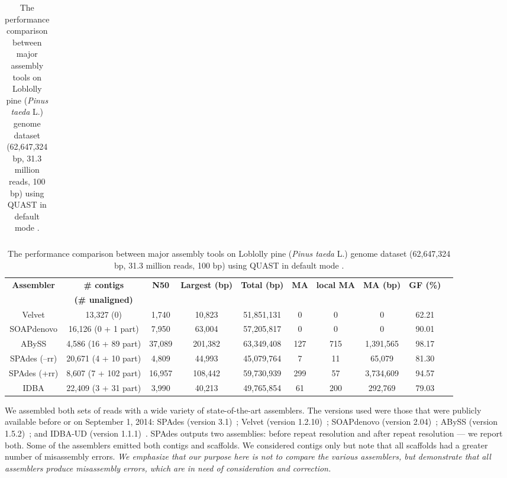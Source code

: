 \begin{table}[h!]
\begin{center}
\begin{tabular}{|c|c|c|c|c|c|c|c|c|c}
\end{tabular}
\label{tab:ging}
\vspace{10mm}
\caption{\footnotesize{The performance comparison between major assembly tools on Loblolly pine ({\em Pinus taeda} L.) genome dataset (62,647,324 bp, 31.3 million reads, 100 bp) using QUAST in default mode \cite{quast}.}}
\label{tab:pine}
\begin{tabular}{|c|c|c|c|c|c|c|c|c|c}
\hline
\textbf{Assembler} 			&{\bf \# contigs }		& \textbf{N50}	& \textbf{Largest (bp)}	& \textbf{Total (bp) }	&\textbf{MA}	&\textbf{local MA}	& {\bf MA (bp)} 		& \textbf{GF (\%)} \\ 
 						&{\bf (\# unaligned) }		& 			& 					& 				&			& 			& 				& \\ \hline
Velvet					& 13,327 (0)			& 1,740		& 10,823				& 51,851,131 		& 0			& 0			& 0				& 62.21			  \\ \hline
SOAPdenovo 				& 16,126 (0 + 1 part)		& 7,950		& 63,004				& 57,205,817 		& 0			& 0			& 0				& 90.01				\\ \hline
ABySS					& 4,586 (16 + 89 part)  	& 37,089  		& 201,382				& 63,349,408		& 127  		& 715		& 1,391,565		& 98.17  			 	 \\ \hline
SPAdes (--rr)				& 20,671 (4 + 10 part) 	& 4,809		& 44,993				& 45,079,764		& 7 			& 11			& 65,079			& 81.30			 	 \\ \hline
SPAdes (+rr)				& 8,607 (7 + 102 part) 	& 16,957		& 108,442				& 59,730,939 		& 299 		& 57			& 3,734,609		& 94.57			 	 \\ \hline
IDBA						& 22,409 (3 + 31 part)	& 3,990 		& 40,213				& 49,765,854		& 61			& 200		& 292,769			& 79.03  				 \\ \hline
\end{tabular}
\end{center}
\end{table}


We assembled both sets of reads with a wide variety of state-of-the-art assemblers.  The versions used were those that were publicly available before or on September 1, 2014: 
SPAdes (version 3.1)~\cite{spades}; Velvet (version  1.2.10)~\cite{Zerbino:2008}; SOAPdenovo (version 2.04)~\cite{soap}; ABySS (version 1.5.2)~\cite{Simpson:2009}; and IDBA-UD (version 1.1.1)~\cite{idbaud}.
SPAdes outputs two assemblies: before repeat resolution and after repeat resolution --- we report both.
Some of the assemblers emitted both contigs and scaffolds.  We considered contigs only but note that all scaffolds had a greater number of misassembly errors. 
{\em We emphasize that our purpose here is not to compare the various assemblers, but demonstrate that all assemblers produce misassembly errors, which are in need of consideration and correction.  } 

